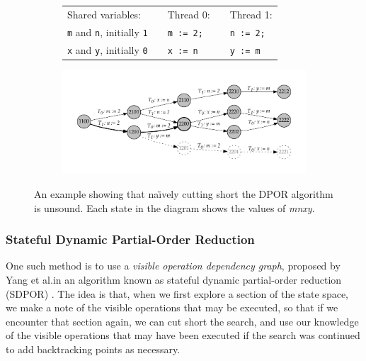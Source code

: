 \documentclass[12pt,a4paper,twoside,openright]{report}
\begin{document}
\begin{figure}
	\begin{subfigure}{\textwidth}
		\begin{tabular}{lp{1cm}lp{0cm}l}
		Shared variables: &&Thread 0: &&Thread 1: \\
		\qquad \texttt{m} and \texttt{n}, initially \texttt{1}
			&&\qquad\texttt{m := 2;}
			&& \qquad\texttt{n := 2;} \\
		\qquad \texttt{x} and \texttt{y}, initially \texttt{0}
			&&\qquad\texttt{x := n}
			&& \qquad\texttt{y := m}
		\end{tabular}
	\end{subfigure}
	\begin{subfigure}{\textwidth}
		\includegraphics[width=\textwidth]{sdpor}
	\end{subfigure}
	\caption[An example illustrating the need for the
		Stateful DPOR algorithm.]
		{An example showing that na\"{\i}vely
		cutting short the DPOR algorithm is
		unsound. Each state in the diagram shows
	the values of \textit{mnxy}.}
	\label{fig:sdpor-motivation}
\end{figure}

\subsubsection{Stateful Dynamic Partial-Order Reduction}

One such method is to use a \emph{visible operation dependency
graph}, proposed by Yang et al.\@ in an
algorithm known as stateful dynamic
partial-order reduction (SDPOR) \cite{yang08}.
The idea is that, when we first explore
a section of the state space,
we make a note of the visible operations
that may be executed, so that if we encounter that section again,
we can cut short the search, and use our knowledge of the
visible operations that may have been
executed if the search was continued
to add backtracking points as necessary.
\end{document}
